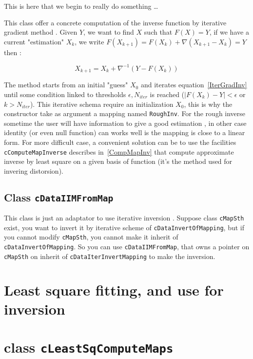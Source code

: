 This is here that we begin to really do something \dots

This class offer a concrete computation of the inverse function by iterative gradient method .
Given $Y$, we want to find $X$  such that $F(X)=Y$,  if we have a current "estimation" $X_k$,
we write $F(X_{k+1}) = F(X_k) + \nabla (X_{k+1}-X_k) = Y$ then :

\begin{equation}
	X_{k+1} = X_k + \nabla ^{-1} (Y-F(X_k)) \label{IterGradInv}
\end{equation}

The method starts  from an initial "guess" $X_0$ and iterates equation~\ref{IterGradInv} until some
condition linked to thresholds $\epsilon,N_{iter}$ is reached ($|F(X_k)-Y|<\epsilon$ or $k>N_{iter}$).
This iterative schema require an initialization $X_0$, this is why the constructor take as
argument a mapping named {\tt RoughInv}. For the rough inverse sometime the user
will have information to give a good estimation , in other case identity (or even 
null function) can works well is the mapping is close to a linear form.  For more difficult case,
a convenient solution can be to use the facilities {\tt cComputeMapInverse} describes in~\ref{CompMapInv}
that compute approximate inverse by least square on a given basis of function (it's the method
used for invering distorsion).

\subsection{Class {\tt cDataIIMFromMap}}

This class is just an adaptator to use iterative inversion . Suppose class {\tt cMapSth} exist,
you want to invert it by iterative scheme of  {\tt cDataInvertOfMapping}, but if you cannot
modify {\tt cMapSth}, you cannot make it inherit of {\tt cDataInvertOfMapping}. So you can
use {\tt cDataIIMFromMap}, that owns a pointer on {\tt cMapSth} on inherit of {\tt cDataIterInvertMapping}
to make the inversion.


\section{Least square fitting, and use for inversion}

\section{class {\tt cLeastSqComputeMaps}}

